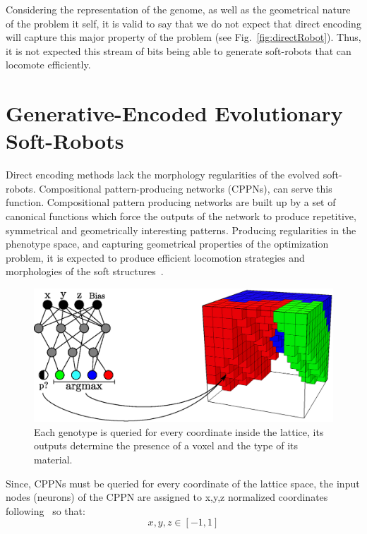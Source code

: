 Considering the representation of the genome, as well as the geometrical nature of the problem it self, it is valid to say that we do not expect that direct encoding will capture this major property of the problem (see Fig.~\ref{fig:directRobot}). Thus, it is not expected this stream of bits being able to generate soft-robots that can locomote efficiently.





\section{Generative-Encoded Evolutionary Soft-Robots}

Direct encoding methods lack the morphology regularities of the evolved soft-robots. Compositional pattern-producing networks (CPPNs), can serve this function. Compositional pattern producing networks are built up by a set of canonical functions which force the outputs of the network to produce repetitive, symmetrical and geometrically interesting patterns. Producing regularities in the phenotype space, and capturing geometrical properties of the optimization problem, it is expected to produce efficient locomotion strategies and morphologies of the soft structures~\citep{cheney2013unshackling}.
\begin{figure}
\centering
\includegraphics[height=0.2\textheight]{../Figures/Misc/cppnSoftBot.eps}
\caption{Each genotype is queried for every coordinate inside the lattice, its outputs determine the presence of a voxel and the type of its material.}
\label{fig:cppnDiagram}
\end{figure}
Since, CPPNs must be queried for every coordinate of the lattice space, the input nodes (neurons) of the CPPN are assigned to x,y,z normalized coordinates following~\citep{cheney2013unshackling} so that:
\[x,y,z \in [-1,1]\]
